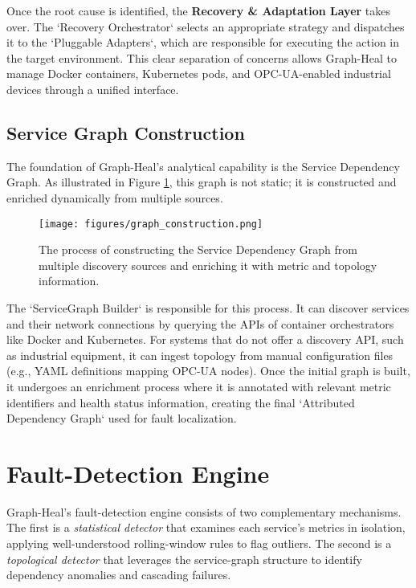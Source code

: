 \documentclass[11pt,conference]{IEEEtran}
\begin{document}
Once the root cause is identified, the \textbf{Recovery \& Adaptation Layer} takes over. The `Recovery Orchestrator` selects an appropriate strategy and dispatches it to the `Pluggable Adapters`, which are responsible for executing the action in the target environment. This clear separation of concerns allows Graph-Heal to manage Docker containers, Kubernetes pods, and OPC-UA-enabled industrial devices through a unified interface.

\subsection{Service Graph Construction}
The foundation of Graph-Heal's analytical capability is the Service Dependency Graph. As illustrated in Figure \ref{fig:graph-construction}, this graph is not static; it is constructed and enriched dynamically from multiple sources.

\begin{figure}[ht]
  \centering
  \texttt{[image: figures/graph\_construction.png]}
  \caption{The process of constructing the Service Dependency Graph from multiple discovery sources and enriching it with metric and topology information.}
  \label{fig:graph-construction}
\end{figure}

The `ServiceGraph Builder` is responsible for this process. It can discover services and their network connections by querying the APIs of container orchestrators like Docker and Kubernetes. For systems that do not offer a discovery API, such as industrial equipment, it can ingest topology from manual configuration files (e.g., YAML definitions mapping OPC-UA nodes). Once the initial graph is built, it undergoes an enrichment process where it is annotated with relevant metric identifiers and health status information, creating the final `Attributed Dependency Graph` used for fault localization.

\section{Fault-Detection Engine}
\label{sec:fault-detection}

Graph-Heal's fault-detection engine consists of two complementary mechanisms.  The first is a \emph{statistical detector} that examines each service's metrics in isolation, applying well-understood rolling-window rules to flag outliers.  The second is a \emph{topological detector} that leverages the service-graph structure to identify dependency anomalies and cascading failures.
\end{document}
